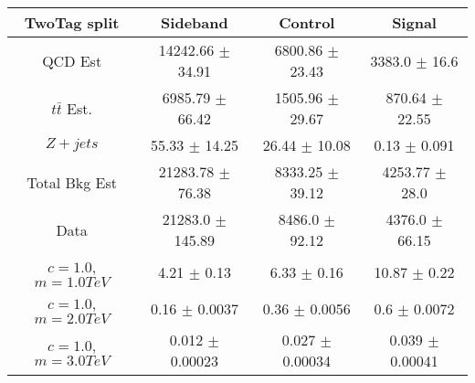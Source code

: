 \begin{footnotesize} 
\begin{tabular}{c|c|c|c} 
TwoTag split & Sideband & Control & Signal \\ 
\hline\hline 
QCD Est & 14242.66 $\pm$ 34.91 & 6800.86 $\pm$ 23.43 & 3383.0 $\pm$ 16.6\\ 
$t\bar{t}$ Est.  & 6985.79 $\pm$ 66.42 & 1505.96 $\pm$ 29.67 & 870.64 $\pm$ 22.55\\ 
$Z+jets$ & 55.33 $\pm$ 14.25 & 26.44 $\pm$ 10.08 & 0.13 $\pm$ 0.091\\ 
Total Bkg Est & 21283.78 $\pm$ 76.38 & 8333.25 $\pm$ 39.12 & 4253.77 $\pm$ 28.0\\ 
Data & 21283.0 $\pm$ 145.89 & 8486.0 $\pm$ 92.12 & 4376.0 $\pm$ 66.15\\ 
$c=1.0$,$m=1.0TeV$ & 4.21 $\pm$ 0.13 & 6.33 $\pm$ 0.16 & 10.87 $\pm$ 0.22\\ 
$c=1.0$,$m=2.0TeV$ & 0.16 $\pm$ 0.0037 & 0.36 $\pm$ 0.0056 & 0.6 $\pm$ 0.0072\\ 
$c=1.0$,$m=3.0TeV$ & 0.012 $\pm$ 0.00023 & 0.027 $\pm$ 0.00034 & 0.039 $\pm$ 0.00041\\ 
\hline\hline 
\end{tabular} 
\end{footnotesize} 
\newline 
